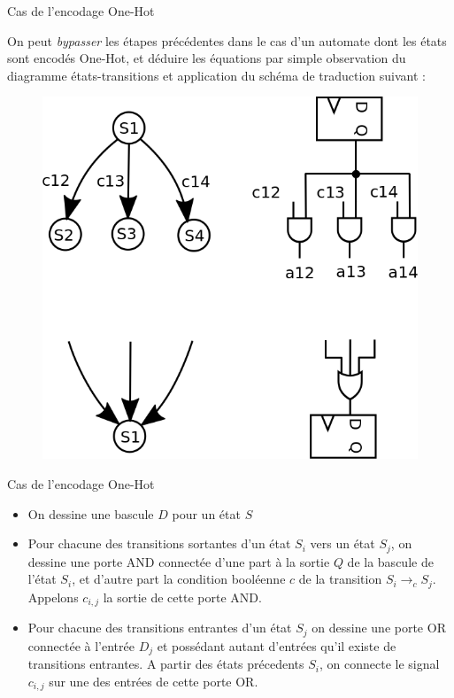\documentclass[xcolor=table]{beamer}
\begin{document}
\begin{frame}{Cas de l'encodage One-Hot}

  On peut {\it bypasser} les étapes précédentes dans le cas d'un automate dont les états sont encodés One-Hot, et déduire
  les équations par simple observation du diagramme états-transitions et application du schéma de traduction suivant :


  \begin{figure}[!htp]
    \centering
    \includegraphics[scale=0.2]{../../POLY/figures/one_hot_method.png}
    \label{fig:one_hot}
  \end{figure}
\end{frame}

\begin{frame}{Cas de l'encodage One-Hot}

  \begin{itemize}
    \item On dessine une bascule $D$ pour un état $S$
    \item Pour chacune des transitions sortantes d'un état $S_i$ vers un état $S_j$, on dessine une porte AND connectée d'une part à la sortie $Q$ de la bascule de l'état $S_i$, et
    d'autre part la condition booléenne $c$ de la transition $S_i\rightarrow_{c} S_j$. Appelons $c_{i,j}$ la sortie de cette porte AND.
    \item Pour chacune des transitions entrantes d'un état $S_j$ on dessine une porte OR connectée à l'entrée $D_j$ et possédant autant d'entrées qu'il existe de transitions entrantes.
    A partir des états précedents $S_i$, on connecte le signal $c_{i,j}$ sur une des entrées de cette porte OR.
  \end{itemize}

\end{frame}
\end{document}
